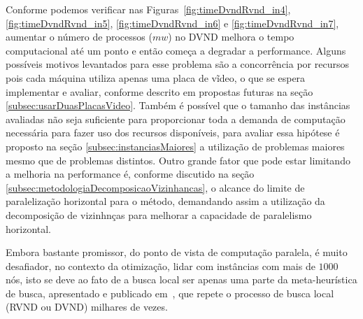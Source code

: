 Conforme podemos verificar nas Figuras~\ref{fig:timeDvndRvnd_in4}, \ref{fig:timeDvndRvnd_in5}, \ref{fig:timeDvndRvnd_in6} e \ref{fig:timeDvndRvnd_in7}, aumentar o número de processos ($mw$) no DVND melhora o tempo computacional até um ponto e então começa a degradar a performance.
Alguns possíveis motivos levantados para esse problema são a concorrência por recursos pois cada máquina utiliza apenas uma placa de vĩdeo, o que se espera implementar e avaliar, conforme descrito em propostas futuras na seção \ref{subsec:usarDuasPlacasVideo}.
Também é possível que o tamanho das instâncias avaliadas não seja suficiente para proporcionar toda a demanda de computação necessária para fazer uso dos recursos disponíveis, para avaliar essa hipótese é proposto na seção \ref{subsec:instanciasMaiores} a utilização de problemas maiores mesmo que de problemas distintos.
Outro grande fator que pode estar limitando a melhoria na performance é, conforme discutido na seção \ref{subsec:metodologiaDecomposicaoVizinhancas}, o alcance do limite de paralelização horizontal para o método, demandando assim a utilização da decomposição de vizinhnças para melhorar a capacidade de paralelismo horizontal.

Embora bastante promissor, do ponto de vista de computação paralela, é muito desafiador, no contexto da otimização, lidar com instâncias com mais de $1000$ nós, isto se deve ao fato de a busca local ser apenas uma parte da meta-heurística de busca, apresentado e publicado em~\cite{jpdc2017}, que repete o processo de busca local (RVND ou DVND) milhares de vezes.





